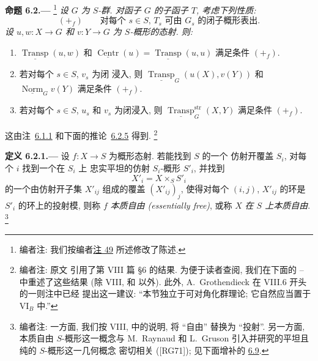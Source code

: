 
\medskip
{}\label{prop:sga3-VIB-6.2}%
\noindent\textbf{命题 6.2.---}%
\footnote{\label{note:sga3-VIB-51}编者注: 我们按编者\hyperref[note:sga3-VIB-49]{注 49}
所述修改了陈述.}
\emph{设 \(G\) 为 \(S\)-群. 对函子 \(G\) 的子函子 \(T\),
考虑下列性质:}
\[
  (+_{\!f})\qquad
  \text{对每个 \(s\in S\), \(T_s\) 可由
  \(G_s\) 的闭子概形表出.}
\]
\emph{设 \(u,w:X\to G\) 和 \(v:Y\to G\) 为
\(S\)-概形的态射. 则:}
\begin{enumerate}
\item[\textup{(i)}]
  \(\underline{\operatorname{Transp}}(u,w)\) 和
  \(\underline{\operatorname{Centr}}(u)
    =\underline{\operatorname{Transp}}(u,u)\)
  满足条件 \((+_{\!f})\).
\item[\textup{(ii)}]
  若对每个 \(s\in S\), \(v_s\) 为闭
  浸入, 则 \(\underline{\operatorname{Transp}}_G(u(X),v(Y))\) 和
  \(\underline{\operatorname{Norm}}_G v(Y)\) 满足条件
  \((+_{\!f})\).
\item[\textup{\SGAInlineRefTarget{prop:sga3-VIB-6.2:item:iii}(iii)}]
  若对每个 \(s\in S\),
  \(u_s\) 和 \(v_s\) 为闭浸入, 则
  \(\underline{\operatorname{Transp}}^{\mathrm{str}}_G(X,Y)\)
  满足条件 \((+_{\!f})\).
\end{enumerate}

这由注~\hyperref[rem:sga3-VIB-6.1.1]{6.1.1}
和下面的推论~\hyperref[cor:sga3-VIB-6.2.5]{6.2.5}
得到.%
\footnote{\label{note:sga3-VIB-52}编者注: 原文
引用了第 VIII 篇 \S6 的结果. 为便于读者查阅,
我们在下面的 --
中重述了这些结果 (除 VIII,  和  以外).
此外, A.\ Grothendieck 在 VIII.6 开头的一则注中已经
提出这一建议: ``本节独立于可对角化群理论;
它自然应当置于
VI\(_B\) 中.''}

\medskip
{}\label{def:sga3-VIB-6.2.1}%
\noindent\textbf{定义 6.2.1.---}
设 \(f:X\to S\) 为概形态射. 若能找到 \(S\) 的一个
仿射开覆盖 \(S_i\), 对每个 \(i\) 找到一个在 \(S_i\) 上
忠实平坦的仿射 \(S_i\)-概形 \(S'_i\), 并找到
\[
  X'_i=X\times_S S'_i
\]
的一个由仿射开子集 \(X'_{ij}\) 组成的覆盖 \((X'_{ij})_j\),
使得对每个 \((i,j)\), \(X'_{ij}\) 的环是 \(S'_i\) 的环上的投射模,
则称 \(f\) \emph{本质自由 (essentially free)}, 或称 \(X\)
\emph{在 \(S\) 上本质自由}.%
\footnote{\label{note:sga3-VIB-53}编者注: 一方面,
我们按 VIII,  中的说明,
将 ``自由'' 替换为 ``投射''. 另一方面, 本质自由
\(S\)-概形这一概念与 M.\ Raynaud 和 L.\ Gruson
引入并研究的平坦且纯的 \(S\)-概形这一几何概念
密切相关 ([RG71]); 见下面增补的
\hyperref[par:sga3-VIB-6.9]{6.9}.}

